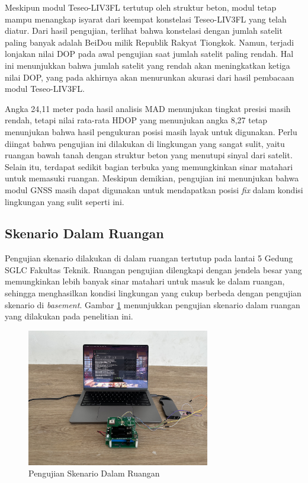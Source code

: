Meskipun modul Teseo-LIV3FL tertutup oleh struktur beton, modul tetap mampu menangkap isyarat dari keempat konstelasi Teseo-LIV3FL yang telah diatur. Dari hasil pengujian, terlihat bahwa konstelasi dengan jumlah satelit paling banyak adalah BeiDou milik Republik Rakyat Tiongkok. Namun, terjadi lonjakan nilai DOP pada awal pengujian saat jumlah satelit paling rendah. Hal ini menunjukkan bahwa jumlah satelit yang rendah akan meningkatkan ketiga nilai DOP, yang pada akhirnya akan menurunkan akurasi dari hasil pembacaan modul Teseo-LIV3FL.

Angka 24,11 meter pada hasil analisis MAD menunjukan tingkat presisi masih rendah, tetapi nilai rata-rata HDOP yang menunjukan angka 8,27 tetap menunjukan bahwa hasil pengukuran posisi masih layak untuk digunakan. Perlu diingat bahwa pengujian ini dilakukan di lingkungan yang sangat sulit, yaitu ruangan bawah tanah dengan struktur beton yang menutupi sinyal dari satelit. Selain itu, terdapat sedikit bagian terbuka yang memungkinkan sinar matahari untuk memasuki ruangan. Meskipun demikian, pengujian ini menunjukan bahwa modul GNSS masih dapat digunakan untuk mendapatkan posisi \textit{fix} dalam kondisi lingkungan yang sulit seperti ini.

\subsection{Skenario Dalam Ruangan}
Pengujian skenario dilakukan di dalam ruangan tertutup pada lantai 5 Gedung SGLC Fakultas Teknik. Ruangan pengujian dilengkapi dengan jendela besar yang memungkinkan lebih banyak sinar matahari untuk masuk ke dalam ruangan, sehingga menghasilkan kondisi lingkungan yang cukup berbeda dengan pengujian skenario di \textit{basement}. Gambar \ref{Fig: indoor-keadaan} menunjukkan pengujian skenario dalam ruangan yang dilakukan pada penelitian ini.

\begin{figure}[H]
	\centering
	\includegraphics[width=8cm]{contents/chapter-4/2-skenario-indoor/keadaan.jpg}
	\caption{Pengujian Skenario Dalam Ruangan}
	\label{Fig: indoor-keadaan}
\end{figure}

